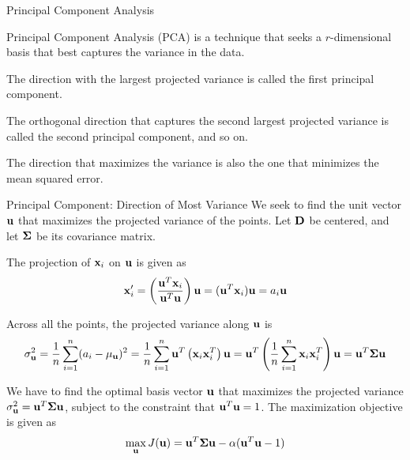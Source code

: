 \begin{frame}{Principal Component Analysis}

Principal Component Analysis (PCA) is a technique that
seeks a $r$-dimensional basis that best captures the
variance in the data.

\medskip
The direction with the largest projected variance is called
the f\/{i}rst principal component.

\medskip
The orthogonal direction that captures
the second largest projected variance is called the second principal component,
and so on. 

\medskip
The direction that maximizes the
variance is also the one that minimizes the mean squared
error.
\end{frame}





\begin{frame}{Principal Component: Direction of Most Variance}
We seek to find the unit vector $\mathbf{u}$ that maximizes the projected
variance of the points. Let $\mathbf{D}$ be centered, and let ${\bm \Sigma}$ be its
covariance matrix.

\medskip
The projection of $\mathbf{x}_i$ on $\mathbf{u}$ is given as
\begin{align*}
  \mathbf{x}_i' =
  \left(\frac{\mathbf{u}^T \mathbf{x}_i}{\mathbf{u}^T\mathbf{u}}\right) \mathbf{u} = (\mathbf{u}^T \mathbf{x}_i) \mathbf{u} =
  a_i \mathbf{u}
\end{align*}

\medskip
Across all the points, the 
projected variance along $\mathbf{u}$ is
\begin{align*}
  \sigma^2_{\mathbf{u}}  
  = \frac{1}{n}\sum_{i=1}^n (a_i-\mu_{\mathbf{u}})^2 
  = \frac{1}{n} \sum_{i=1}^n \mathbf{u}^T \left(\mathbf{x}_{i}\mathbf{x}_i^T\right) \mathbf{u}
   =  \mathbf{u}^T \left(\frac{1}{n}\sum_{i=1}^n \mathbf{x}_i\mathbf{x}_i^T\right) \mathbf{u}
  =  \mathbf{u}^T {\bm \Sigma} \mathbf{u}
\end{align*}


\medskip
We have to find the
optimal basis vector $\mathbf{u}$ that maximizes the projected variance 
$\sigma^2_{\mathbf{u}} = \mathbf{u}^T {\bm \Sigma} \mathbf{u}$, subject to the 
constraint that $\mathbf{u}^T\mathbf{u}=1$. The maximization objective is given as
\begin{align*}
  \max_{\mathbf{u}} J(\mathbf{u}) = 
  \mathbf{u}^T {\bm \Sigma} \mathbf{u} - \alpha (\mathbf{u}^T\mathbf{u}-1)
\end{align*}

\end{frame}


